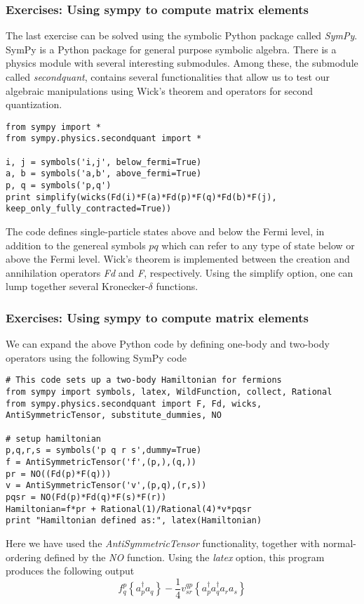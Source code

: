 \documentclass{beamer}
\begin{document}
\begin{frame}
\frametitle{Exercises: Using sympy to compute matrix elements}

\begin{block}{}
The last exercise can be solved using the symbolic Python package called \emph{SymPy}. SymPy is a Python 
package for general purpose symbolic algebra. There is a physics module with several interesting submodules.
Among these, the submodule called \emph{secondquant}, contains several  functionalities that allow us to test
our algebraic manipulations using Wick's theorem and operators for second quantization.
\begin{verbatim}
from sympy import *
from sympy.physics.secondquant import *

i, j = symbols('i,j', below_fermi=True)
a, b = symbols('a,b', above_fermi=True)
p, q = symbols('p,q')
print simplify(wicks(Fd(i)*F(a)*Fd(p)*F(q)*Fd(b)*F(j), keep_only_fully_contracted=True))
\end{verbatim}
The code defines single-particle states above and below the Fermi level, in addition to the genereal symbols
$pq$ which can refer to any type of state below or above the Fermi level. Wick's theorem is implemented between 
the creation and annihilation operators \emph{Fd} and \emph{F}, respectively. Using the simplify option, one can lump together several Kronecker-$\delta$ functions. 

\end{block}
\end{frame}

\begin{frame}
\frametitle{Exercises: Using sympy to compute matrix elements}

\begin{block}{}
We can expand the above Python code by defining one-body and two-body operators using  the following SymPy code 
\begin{verbatim}
# This code sets up a two-body Hamiltonian for fermions
from sympy import symbols, latex, WildFunction, collect, Rational
from sympy.physics.secondquant import F, Fd, wicks, AntiSymmetricTensor, substitute_dummies, NO

# setup hamiltonian
p,q,r,s = symbols('p q r s',dummy=True)
f = AntiSymmetricTensor('f',(p,),(q,))
pr = NO((Fd(p)*F(q)))
v = AntiSymmetricTensor('v',(p,q),(r,s))
pqsr = NO(Fd(p)*Fd(q)*F(s)*F(r))
Hamiltonian=f*pr + Rational(1)/Rational(4)*v*pqsr
print "Hamiltonian defined as:", latex(Hamiltonian)
\end{verbatim}
Here we have used the \emph{AntiSymmetricTensor} functionality, together with normal-ordering defined by the \emph{NO} function. 
Using the \emph{latex} option, this program produces the following output
\[
f^{p}_{q} \left\{a^\dagger_{p} a_{q}\right\} - \frac{1}{4} v^{qp}_{sr} \left\{a^\dagger_{p} a^\dagger_{q} a_{r} a_{s}\right\}
\]
\end{block}
\end{frame}
\end{document}
